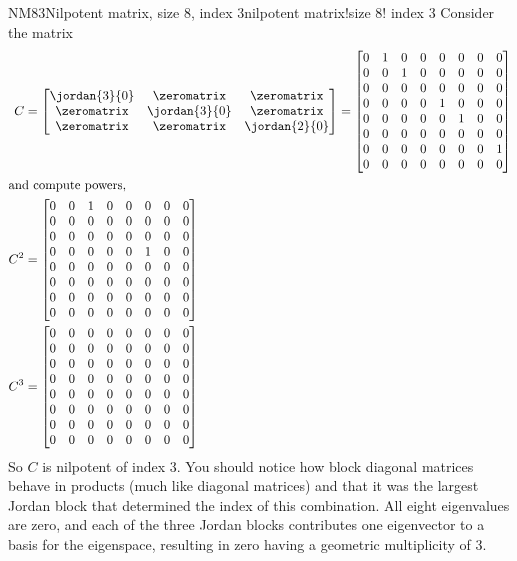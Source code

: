 \begin{example}{NM83}{Nilpotent matrix, size 8, index 3}{nilpotent matrix!size 8! index 3}
Consider the matrix
%
\begin{align*}
%
C&=
\begin{bmatrix}
\jordan{3}{0} & \zeromatrix & \zeromatrix \\
\zeromatrix & \jordan{3}{0} & \zeromatrix \\
\zeromatrix & \zeromatrix & \jordan{2}{0}
\end{bmatrix}
=
%
\begin{bmatrix}
 0 & 1 & 0 & 0 & 0 & 0 & 0 & 0 \\
 0 & 0 & 1 & 0 & 0 & 0 & 0 & 0 \\
 0 & 0 & 0 & 0 & 0 & 0 & 0 & 0 \\
 0 & 0 & 0 & 0 & 1 & 0 & 0 & 0 \\
 0 & 0 & 0 & 0 & 0 & 1 & 0 & 0 \\
 0 & 0 & 0 & 0 & 0 & 0 & 0 & 0 \\
 0 & 0 & 0 & 0 & 0 & 0 & 0 & 1 \\
 0 & 0 & 0 & 0 & 0 & 0 & 0 & 0
\end{bmatrix}\\
%
\intertext{and compute powers,}
%
C^2&=
\begin{bmatrix}
 0 & 0 & 1 & 0 & 0 & 0 & 0 & 0 \\
 0 & 0 & 0 & 0 & 0 & 0 & 0 & 0 \\
 0 & 0 & 0 & 0 & 0 & 0 & 0 & 0 \\
 0 & 0 & 0 & 0 & 0 & 1 & 0 & 0 \\
 0 & 0 & 0 & 0 & 0 & 0 & 0 & 0 \\
 0 & 0 & 0 & 0 & 0 & 0 & 0 & 0 \\
 0 & 0 & 0 & 0 & 0 & 0 & 0 & 0 \\
 0 & 0 & 0 & 0 & 0 & 0 & 0 & 0
\end{bmatrix}\\
%
C^3&=
\begin{bmatrix}
 0 & 0 & 0 & 0 & 0 & 0 & 0 & 0 \\
 0 & 0 & 0 & 0 & 0 & 0 & 0 & 0 \\
 0 & 0 & 0 & 0 & 0 & 0 & 0 & 0 \\
 0 & 0 & 0 & 0 & 0 & 0 & 0 & 0 \\
 0 & 0 & 0 & 0 & 0 & 0 & 0 & 0 \\
 0 & 0 & 0 & 0 & 0 & 0 & 0 & 0 \\
 0 & 0 & 0 & 0 & 0 & 0 & 0 & 0 \\
 0 & 0 & 0 & 0 & 0 & 0 & 0 & 0
\end{bmatrix}
%
\end{align*}
%
So $C$ is nilpotent of index 3.  You should notice how block diagonal matrices behave in products (much like diagonal matrices) and that it was the largest Jordan block that determined the index of this combination.  All eight eigenvalues are zero, and each of the three Jordan blocks contributes one eigenvector to a basis for the eigenspace, resulting in zero having a geometric multiplicity of 3.
%
\end{example}
